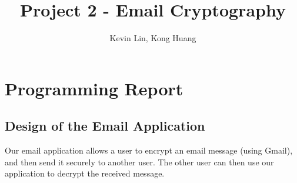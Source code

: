 \documentclass[a4paper,twoside,10pt]{report}
\begin{document}
\pagestyle{empty} %



\title{Project 2 - Email Cryptography}
\author{Kevin Lin, Kong Huang}
\maketitle



\tableofcontents %
\cleardoublepage %

\pagestyle{plain} %


\chapter{Programming Report}\label{report}

\section{Design of the Email Application}\label{members}

Our email application allows a user to encrypt an email message (using Gmail), and then send it securely to another user. The other user can then use our application to decrypt the received message. 
\end{document}
